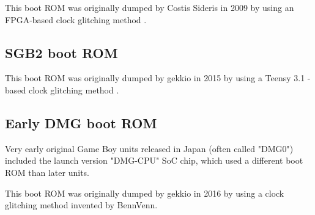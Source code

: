 \documentclass[\main/gbctr.tex]{subfiles}
\begin{document}
This boot ROM was originally dumped by Costis Sideris in 2009 by using an
FPGA-based clock glitching method \cite{costis_sgb}.

\subsection{SGB2 boot ROM}

This boot ROM was originally dumped by gekkio in 2015 by using a Teensy 3.1
-based clock glitching method \cite{gekkio_sgb2}.

\subsection{Early DMG boot ROM}

Very early original Game Boy units released in Japan (often called "DMG0")
included the launch version "DMG-CPU" SoC chip, which used a different boot ROM
than later units.

This boot ROM was originally dumped by gekkio in 2016 by using a clock
glitching method invented by BennVenn.
\end{document}

